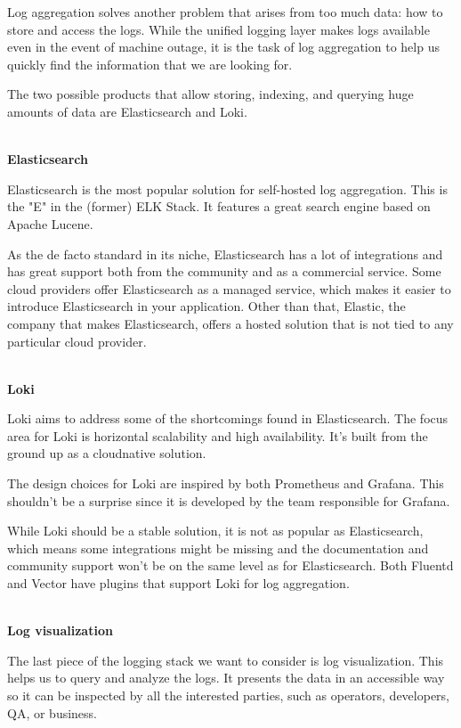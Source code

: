 Log aggregation solves another problem that arises from too much data: how to store and access the logs. While the unified logging layer makes logs available even in the event of machine outage, it is the task of log aggregation to help us quickly find the information that we are looking for.

The two possible products that allow storing, indexing, and querying huge amounts of data are Elasticsearch and Loki.

\hspace*{\fill} \\ %
\noindent
\textbf{Elasticsearch}

Elasticsearch is the most popular solution for self-hosted log aggregation. This is the "E" in the (former) ELK Stack. It features a great search engine based on Apache Lucene.

As the de facto standard in its niche, Elasticsearch has a lot of integrations and has great support both from the community and as a commercial service. Some cloud providers offer Elasticsearch as a managed service, which makes it easier to introduce Elasticsearch in your application. Other than that, Elastic, the company that makes Elasticsearch, offers a hosted solution that is not tied to any particular cloud provider.

\hspace*{\fill} \\ %
\noindent
\textbf{Loki}

Loki aims to address some of the shortcomings found in Elasticsearch. The focus area for Loki is horizontal scalability and high availability. It’s built from the ground up as a cloudnative solution.

The design choices for Loki are inspired by both Prometheus and Grafana. This shouldn't be a surprise since it is developed by the team responsible for Grafana.

While Loki should be a stable solution, it is not as popular as Elasticsearch, which means some integrations might be missing and the documentation and  community support won't be on the same level as for Elasticsearch. Both Fluentd and Vector have plugins that support Loki for log aggregation.

\hspace*{\fill} \\ %
\noindent
\textbf{Log visualization}

The last piece of the logging stack we want to consider is log visualization. This helps us to query and analyze the logs. It presents the data in an accessible way so it can be inspected by all the interested parties, such as operators, developers, QA, or business.

